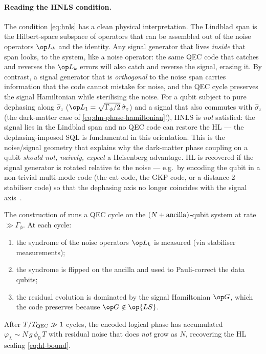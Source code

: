\paragraph{Reading the HNLS condition.}
The condition \cref{eq:hnls} has a clean physical
interpretation. The Lindblad span is the Hilbert-space subspace
of operators that can be assembled out of the noise operators
$\op L_k$ and the identity. Any signal generator that lives
\emph{inside} that span looks, to the system, like a noise
operator: the same QEC code that catches and reverses the
$\op L_k$ errors will also catch and reverse the signal,
erasing it. By contrast, a signal generator that is
\emph{orthogonal} to the noise span carries information that
the code cannot mistake for noise, and the QEC cycle preserves
the signal Hamiltonian while sterilising the noise. For a
qubit subject to pure dephasing along $\hat\sigma_z$
($\op L_1=\sqrt{\Gamma_\phi/2}\,\hat\sigma_z$) and a signal that
also commutes with $\hat\sigma_z$ (the dark-matter case of
\cref{eq:dm-phase-hamiltonian}!), HNLS is \emph{not}
satisfied: the signal lies in the Lindblad span and no QEC
code can restore the HL --- the dephasing-imposed SQL is
fundamental in this orientation. This is the noise/signal
geometry that explains why the dark-matter phase coupling on a
qubit \emph{should not, naively, expect} a Heisenberg
advantage. HL is recovered if the signal generator is rotated
relative to the noise --- e.g.\ by encoding the qubit in a
non-trivial multi-mode code (the cat code, the GKP code, or a
distance-2 stabiliser code) so that the dephasing axis no
longer coincides with the signal axis~\cite{kessler2014,arrad2014,dur2014,zhou2018}.

\begin{statement}
\label{stmt:qec-sensing}
The construction of \cite{zhou2018} runs a QEC cycle on
the $(N+\rm{ancilla})$-qubit system at rate $\gg \Gamma_\phi$.
At each cycle:
\begin{enumerate}
  \item the syndrome of the noise operators $\op L_k$ is
        measured (via stabiliser measurements);
  \item the syndrome is flipped on the ancilla and used to
        Pauli-correct the data qubits;
  \item the residual evolution is dominated by the
        signal Hamiltonian $\op G$, which the code preserves
        because $\op G\notin\op{LS}$.
\end{enumerate}
After $T/T_{\rm QEC}\gg 1$ cycles, the encoded logical phase
has accumulated $\varphi_L \sim N\,g\,\phi_0\,T$ with residual
noise that does \emph{not} grow as $N$, recovering
the HL scaling \cref{eq:hl-bound}.
\end{statement}

